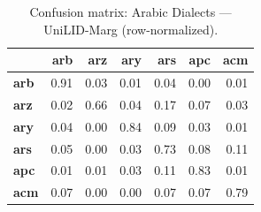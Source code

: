 \begin{table}[htbp]
\centering
\small
\begin{tabular}{lrrrrrr}
\toprule
 & \textbf{arb} & \textbf{arz} & \textbf{ary} & \textbf{ars} & \textbf{apc} & \textbf{acm} \\
\midrule
\textbf{arb} & \cellcolor{blue!91}\color{white}0.91 & \cellcolor{blue!2}0.03 & \cellcolor{blue!1}0.01 & \cellcolor{blue!3}0.04 & \cellcolor{blue!0}0.00 & \cellcolor{blue!0}0.01 \\
\textbf{arz} & \cellcolor{blue!2}0.02 & \cellcolor{blue!66}\color{white}0.66 & \cellcolor{blue!3}0.04 & \cellcolor{blue!16}0.17 & \cellcolor{blue!7}0.07 & \cellcolor{blue!3}0.03 \\
\textbf{ary} & \cellcolor{blue!3}0.04 & \cellcolor{blue!0}0.00 & \cellcolor{blue!83}\color{white}0.84 & \cellcolor{blue!8}0.09 & \cellcolor{blue!2}0.03 & \cellcolor{blue!1}0.01 \\
\textbf{ars} & \cellcolor{blue!5}0.05 & \cellcolor{blue!0}0.00 & \cellcolor{blue!2}0.03 & \cellcolor{blue!72}\color{white}0.73 & \cellcolor{blue!8}0.08 & \cellcolor{blue!10}0.11 \\
\textbf{apc} & \cellcolor{blue!1}0.01 & \cellcolor{blue!0}0.01 & \cellcolor{blue!3}0.03 & \cellcolor{blue!10}0.11 & \cellcolor{blue!82}\color{white}0.83 & \cellcolor{blue!1}0.01 \\
\textbf{acm} & \cellcolor{blue!7}0.07 & \cellcolor{blue!0}0.00 & \cellcolor{blue!0}0.00 & \cellcolor{blue!7}0.07 & \cellcolor{blue!7}0.07 & \cellcolor{blue!78}\color{white}0.79 \\
\bottomrule
\end{tabular}
\caption{Confusion matrix: Arabic Dialects — UniLID-Marg (row-normalized).}
\label{tab:cm-arabic_dialects-unilid-marg}
\end{table}

